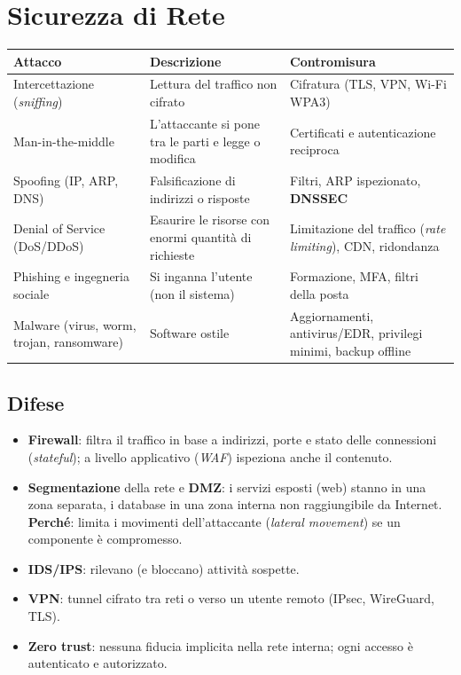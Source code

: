 \section{Sicurezza di Rete}
\begin{center}
\small
\begin{tabularx}{\textwidth}{@{}>{\raggedright\arraybackslash}p{3.3cm}XX@{}}
\toprule
\textbf{Attacco} & \textbf{Descrizione} & \textbf{Contromisura} \\
\midrule
Intercettazione (\emph{sniffing}) & Lettura del traffico non cifrato & Cifratura (TLS, VPN, Wi-Fi WPA3) \\
Man-in-the-middle & L'attaccante si pone tra le parti e legge o modifica & Certificati e autenticazione reciproca \\
Spoofing (IP, ARP, DNS) & Falsificazione di indirizzi o risposte & Filtri, ARP ispezionato, \textbf{DNSSEC} \\
Denial of Service (DoS/DDoS) & Esaurire le risorse con enormi quantità di richieste & Limitazione del traffico (\emph{rate limiting}), CDN, ridondanza \\
Phishing e ingegneria sociale & Si inganna l'utente (non il sistema) & Formazione, MFA, filtri della posta \\
Malware (virus, worm, trojan, ransomware) & Software ostile & Aggiornamenti, antivirus/EDR, privilegi minimi, backup offline \\
\bottomrule
\end{tabularx}
\end{center}

\subsection{Difese}
\begin{itemize}
    \item \textbf{Firewall}: filtra il traffico in base a indirizzi, porte e stato delle connessioni (\emph{stateful}); a livello applicativo (\emph{WAF}) ispeziona anche il contenuto.
    \item \textbf{Segmentazione} della rete e \textbf{DMZ}: i servizi esposti (web) stanno in una zona separata, i database in una zona interna non raggiungibile da Internet. \textbf{Perché}: limita i movimenti dell'attaccante (\emph{lateral movement}) se un componente è compromesso.
    \item \textbf{IDS/IPS}: rilevano (e bloccano) attività sospette.
    \item \textbf{VPN}: tunnel cifrato tra reti o verso un utente remoto (IPsec, WireGuard, TLS).
    \item \textbf{Zero trust}: nessuna fiducia implicita nella rete interna; ogni accesso è autenticato e autorizzato.
\end{itemize}


